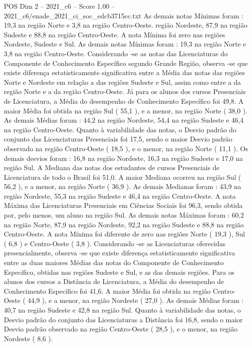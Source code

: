 \begin{textsample}{POS Dim 2 – 2021\_c6 – Score 1.00 – 2021\_c6/enade\_2021\_ci\_soc\_edcb3715cc.txt}
As demais notas Mínimas foram : 19,3 na região Norte e 3,8 na região Centro-Oeste. região Nordeste, 87,9 na região Sudeste e 88,8 na região Centro-Oeste.
A nota Mínima foi zero nas regiões Nordeste, Sudeste e Sul.
As demais notas Mínimas foram : 19,3 na região Norte e 3,8 na região Centro-Oeste.
Considerando -se as notas das Licenciaturas do Componente de Conhecimento Específico segundo Grande Região, observa -se que existe diferença estatisticamente significativa entre a Média das notas das regiões Norte e Nordeste em relação a das regiões Sudeste e Sul, assim como entre a da região Norte e a da região Centro-Oeste.
Já para os alunos dos cursos Presenciais de Licenciatura, a Média do desempenho de Conhecimento Específico foi 49,8.
A maior Média foi obtida na região Sul ( 55,1 ), e a menor, na região Norte ( 38,0 ).
As demais Médias foram : 44,2 na região Nordeste, 54,4 na região Sudeste e 46,4 na região Centro-Oeste.
Quanto à variabilidade das notas, o Desvio padrão do conjunto das Licenciaturas Presenciais foi 17,5, sendo o maior Desvio padrão observado na região Centro-Oeste ( 18,5 ), e o menor, na região Norte ( 11,1 ).
Os demais desvios foram : 16,8 na região Nordeste, 16,3 na região Sudeste e 17,0 na região Sul.
A Mediana das notas dos estudantes de cursos Presenciais de Licenciatura de todo o Brasil foi 51,0.
A maior Mediana ocorreu na região Sul ( 56,2 ), e a menor, na região Norte ( 36,9 ).
As demais Medianas foram : 43,9 na região Nordeste, 55,3 na região Sudeste e 46,4 na região Centro-Oeste.
A nota Máxima das Licenciaturas Presenciais em Ciências Sociais foi 96,3, sendo obtida por, pelo menos, um aluno na região Sul.
As demais notas Máximas foram : 60,2 na região Norte, 87,9 na região Nordeste, 92,2 na região Sudeste e 88,8 na região Centro-Oeste.
A nota Mínima foi diferente de zero nas regiões Norte ( 19,3 ), Sul ( 6,8 ) e Centro-Oeste ( 3,8 ).
Considerando -se as Licenciaturas oferecidas presencialmente, observa -se que existe diferença estatisticamente significativa entre as duas maiores Médias das notas do Componente de Conhecimento Específico, obtidas nas regiões Sudeste e Sul, e as das demais regiões.
Para os alunos dos cursos a Distância de Licenciatura, a Média do desempenho de Conhecimento Específico foi 41,6.
A maior Média foi obtida na região Centro-Oeste ( 44,9 ), e a menor, na região Nordeste ( 27,0 ).
As demais Médias foram : 40,7 na região Sudeste e 42,8 na região Sul.
Quanto à variabilidade das notas, o Desvio padrão do conjunto das Licenciaturas a Distância foi 16,8, sendo o maior Desvio padrão observado na região Centro-Oeste ( 28,5 ), e o menor, na região Nordeste ( 8,6 ).

\end{textsample}
